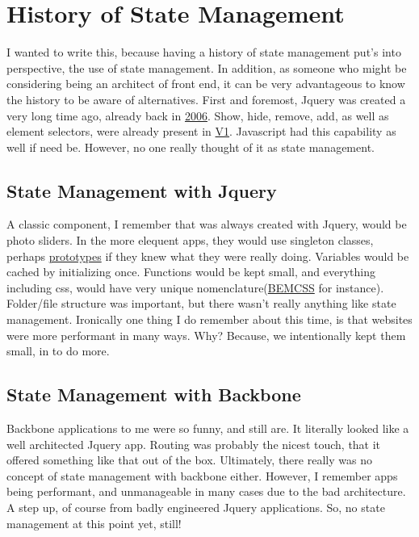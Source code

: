 \maketitle{}
\section{ History of State Management }

I wanted to write this, because having a history of state management put's into
perspective, the use of state management. In addition, as someone who might be
considering being an architect of front end, it can be very advantageous to
know the history to be aware of alternatives. First and foremost, Jquery was
created a very long time ago, already back in \href{https://en.wikipedia.org/wiki/JQuery}{2006}.
Show, hide, remove, add, as well as element selectors, were already present in
\href{http://api.jquery.com/category/version/1.0/}{V1}. Javascript had this capability
as well if need be. However, no one really thought of it as state management.

\subsection{ State Management with Jquery }
A classic component, I remember that was always created with Jquery, would be
photo sliders. In the more elequent apps, they would use singleton classes,
perhaps \href{https://www.w3schools.com/js/js\_object\_prototypes.asp}{prototypes}
if they knew what they were really doing. Variables would be cached by
initializing once. Functions would be kept small, and everything including css,
would have very unique nomenclature(\href{http://getbem.com/introduction/}{BEMCSS}
for instance). Folder/file structure was important, but there wasn't really
anything like state management. Ironically one thing I do remember about this
time, is that websites were more performant in many ways. Why? Because, we
intentionally kept them small, in to do more.


\subsection{ State Management with Backbone }
Backbone applications to me were so funny, and still are. It literally looked
like a well architected Jquery app. Routing was probably the nicest touch, that
it offered something like that out of the box. Ultimately, there really was no
concept of state management with backbone either. However, I remember apps being
performant, and unmanageable in many cases due to the bad architecture. A step
up, of course from badly engineered Jquery applications. So, no state management
at this point yet, still!

